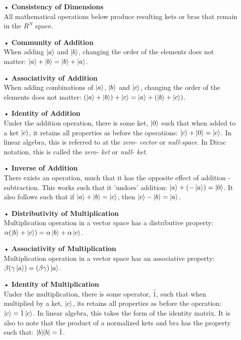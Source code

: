 \documentclass[12pt,letterpaper]{book}
\begin{document}
\begin{enumerate}
\item[•]\textbf{Consistency of Dimensions}\\
All mathematical operations below produce resulting kets or bras that remain in the $R^N$ space.
\item[•]\textbf{Community of Addition}\\
When adding $\ket{a}$ and $\ket{b}$, changing the order of the elements does not matter: 
$\ket{a} + \ket{b} = \ket{b} + \ket{a}$. 
\item[•]\textbf{Associativity of Addition}\\
When adding combinations of $\ket{a}$, $\ket{b}$ and $\ket{c}$, changing the order of the elements does not matter:
$(\ket{a} + \ket{b}) + \ket{c} = \ket{a} + (\ket{b} + \ket{c})$.
\item[•]\textbf{Identity of Addition}\\
Under the addition operation, there is some ket, $\ket{0}$ such that when added to a ket $\ket{c}$, it retains all properties as before the operations: $\ket{c} + \ket{0} = \ket{c}$. In linear algebra, this is referred to at the \textit{zero- vector} or \textit{null-space}. In Dirac notation, this is called the \textit{zero- ket} or \textit{null- ket}.
\item[•]\textbf{Inverse of Addition}\\
There exists an operation, much that it has the opposite effect of addition - subtraction. This works such that it 'undoes' addition: $\ket{a}+ (-\ket{a}) = \ket{0}$. It also follows such that if $\ket{a} + \ket{b} = \ket{c}$, then $\ket{c} - \ket{b} = \ket{a}$.
\item[•]\textbf{Distributivity of Multiplication }\\
Multiplication operation in a vector space has a distributive property: $\alpha(\ket{b} + \ket{c}) = \alpha\ket{b} + \alpha\ket{c}$.
\item[•]\textbf{Associativity of Multiplication}\\
Multiplication operation in a vector space has an associative property: $\beta(\gamma\ket{a}) = (\beta\gamma)\ket{a}$.
\item[•]\textbf{Identity of Multiplication}\\
Under the multiplication, there is some operator, $\hat{1}$, such that when multiplied by a ket, $\ket{c}$, its retains all properties as before the operation: $\ket{c} = \hat{1}\ket{c}$. In linear algebra, this takes the form of the identity matrix. It is also to note that the  product of a normalized kets and bra has the property such that: $\ketbra{b}{b} = \hat{1}$.


\end{enumerate}
\end{document}
